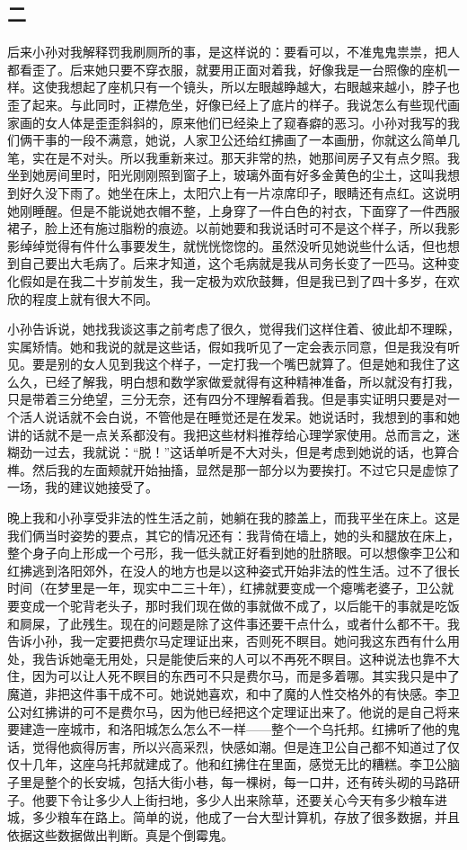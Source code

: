 \subsection{二} 

后来小孙对我解释罚我刷厕所的事，是这样说的：要看可以，不准鬼鬼祟祟，把人都看歪了。后来她只要不穿衣服，就要用正面对着我，好像我是一台照像的座机一样。这使我想起了座机只有一个镜头，所以左眼越睁越大，右眼越来越小，脖子也歪了起来。与此同时，正襟危坐，好像已经上了底片的样子。我说怎么有些现代画家画的女人体是歪歪斜斜的，原来他们已经染上了窥春癖的恶习。小孙对我写的我们俩干事的一段不满意，她说，人家卫公还给红拂画了一本画册，你就这么简单几笔，实在是不对头。所以我重新来过。那天非常的热，她那间房子又有点夕照。我坐到她房间里时，阳光刚刚照到窗子上，玻璃外面有好多金黄色的尘土，这叫我想到好久没下雨了。她坐在床上，太阳穴上有一片凉席印子，眼睛还有点红。这说明她刚睡醒。但是不能说她衣帽不整，上身穿了一件白色的衬衣，下面穿了一件西服裙子，脸上还有施过脂粉的痕迹。以前她要和我说话时可不是这个样子，所以我影影绰绰觉得有件什么事要发生，就恍恍惚惚的。虽然没听见她说些什么话，但也想到自己要出大毛病了。后来才知道，这个毛病就是我从司务长变了一匹马。这种变化假如是在我二十岁前发生，我一定极为欢欣鼓舞，但是我已到了四十多岁，在欢欣的程度上就有很大不同。 

小孙告诉说，她找我谈这事之前考虑了很久，觉得我们这样住着、彼此却不理睬，实属矫情。她和我说的就是这些话，假如我听见了一定会表示同意，但是我没有听见。要是别的女人见到我这个样子，一定打我一个嘴巴就算了。但是她和我住了这么久，已经了解我，明白想和数学家做爱就得有这种精神准备，所以就没有打我，只是带着三分绝望，三分无奈，还有四分不理解看着我。但是事实证明只要是对一个活人说话就不会白说，不管他是在睡觉还是在发呆。她说话时，我想到的事和她讲的话就不是一点关系都没有。我把这些材料推荐给心理学家使用。总而言之，迷糊劲一过去，我就说：“脱！”这话单听是不大对头，但是考虑到她说的话，也算合榫。然后我的左面颊就开始抽搐，显然是那一部分以为要挨打。不过它只是虚惊了一场，我的建议她接受了。 

晚上我和小孙享受非法的性生活之前，她躺在我的膝盖上，而我平坐在床上。这是我们俩当时姿势的要点，其它的情况还有：我背倚在墙上，她的头和腿放在床上，整个身子向上形成一个弓形，我一低头就正好看到她的肚脐眼。可以想像李卫公和红拂逃到洛阳郊外，在没人的地方也是以这种姿式开始非法的性生活。过不了很长时间（在梦里是一年，现实中二三十年），红拂就要变成一个瘪嘴老婆子，卫公就要变成一个驼背老头子，那时我们现在做的事就做不成了，以后能干的事就是吃饭和屙屎，了此残生。现在的问题是除了这件事还要干点什么，或者什么都不干。我告诉小孙，我一定要把费尔马定理证出来，否则死不瞑目。她问我这东西有什么用处，我告诉她毫无用处，只是能使后来的人可以不再死不瞑目。这种说法也靠不大住，因为可以让人死不瞑目的东西可不只是费尔马，而是多着哪。其实我只是中了魔道，非把这件事干成不可。她说她喜欢，和中了魔的人性交格外的有快感。李卫公对红拂讲的可不是费尔马，因为他已经把这个定理证出来了。他说的是自己将来要建造一座城市，和洛阳城怎么怎么不一样——整个一个乌托邦。红拂听了他的鬼话，觉得他疯得厉害，所以兴高采烈，快感如潮。但是连卫公自己都不知道过了仅仅十几年，这座乌托邦就建成了。他和红拂住在里面，感觉无比的糟糕。李卫公脑子里是整个的长安城，包括大街小巷，每一棵树，每一口井，还有砖头砌的马路研子。他要下令让多少人上街扫地，多少人出来除草，还要关心今天有多少粮车进城，多少粮车在路上。简单的说，他成了一台大型计算机，存放了很多数据，并且依据这些数据做出判断。真是个倒霉鬼。 

